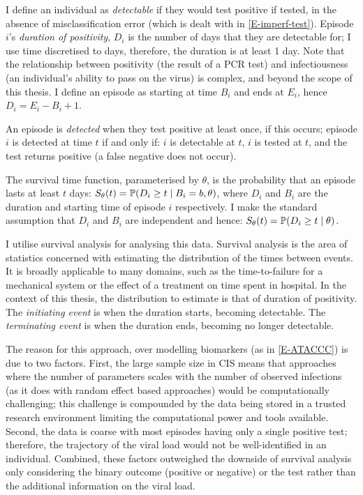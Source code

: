 \documentclass[thesis.tex]{subfiles}
\begin{document}
I define an individual as \emph{detectable} if they would test positive if tested, in the absence of misclassification error (which is dealt with in \cref{E-imperf-test}).
Episode $i$'s \emph{duration of positivity}, $D_i$ is the number of days that they are detectable for; I use time discretised to days, therefore, the duration is at least 1 day.
Note that the relationship between positivity (\ie the result of a PCR test) and infectiousness (\ie an individual's ability to pass on the virus) is complex,  and beyond the scope of this thesis.
I define an episode as starting at time $B_i$ and ends at $E_i$, hence $D_i = E_i - B_i + 1$.

An episode is \emph{detected} when they test positive at least once, if this occurs; episode $i$ is detected at time $t$ if and only if: $i$ is detectable at $t$, $i$ is tested at $t$, and the test returns positive (a false negative does not occur).

The survival time function, parameterised by $\theta$, is the probability that an episode lasts at least $t$ days: $S_\theta(t) = \operatorname{\mathbb{P}}(D_i \geq t \mid B_i = b, \theta)$, where $D_i$ and $B_i$ are the duration and starting time of episode $i$ respectively.
I make the standard assumption that $D_i$ and $B_i$ are independent and hence: $S_\theta(t) = \operatorname{\mathbb{P}}(D_i \geq t \mid \theta)$.

I utilise survival analysis for analysing this data.
Survival analysis is the area of statistics concerned with estimating the distribution of the times between events.
It is broadly applicable to many domains, such as the time-to-failure for a mechanical system or the effect of a treatment on time spent in hospital.
In the context of this thesis, the distribution to estimate is that of duration of positivity.
The \emph{initiating event} is when the duration starts, \ie becoming detectable.
The \emph{terminating event} is when the duration ends, \ie becoming no longer detectable.

The reason for this approach, over modelling biomarkers (as in \cref{E-ATACCC}) is due to two factors.
First, the large sample size in CIS means that approaches where the number of parameters scales with the number of observed infections (as it does with random effect based approaches) would be computationally challenging; this challenge is compounded by the data being stored in a trusted research environment limiting the computational power and tools available.
Second, the data is coarse with most episodes having only a single positive test; therefore, the trajectory of the viral load would not be well-identified in an individual.
Combined, these factors outweighed the downside of survival analysis only considering the binary outcome (\ie positive or negative) or the test rather than the additional information on the viral load.
\end{document}
